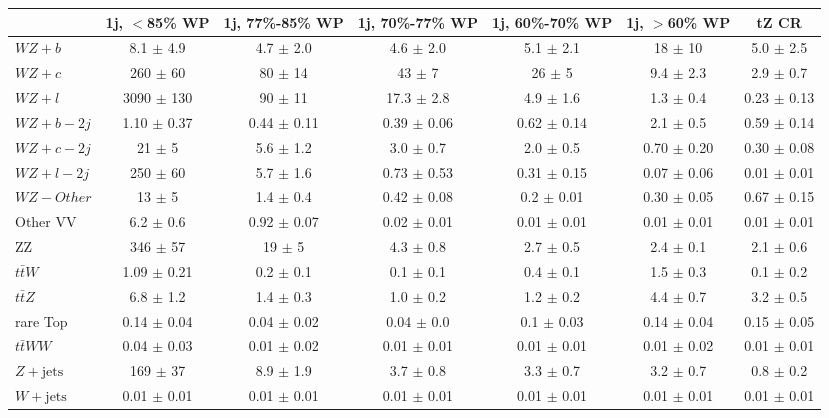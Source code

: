 \begin{tabular}{|l|c|c|c|c|c|c|}
\hline 
 & {1j, $<$85\% WP} & {1j, 77\%-85\% WP} & {1j, 70\%-77\% WP} & {1j, 60\%-70\% WP} & {1j, $>$60\% WP} & {tZ CR}\\
\hline 
  $WZ + b$   & 8.1 $\pm$ 4.9 & 4.7 $\pm$ 2.0 & 4.6 $\pm$ 2.0 & 5.1 $\pm$ 2.1 & 18 $\pm$ 10 & 5.0 $\pm$ 2.5 \\ 
  $WZ + c$   & 260 $\pm$ 60 & 80 $\pm$ 14 & 43 $\pm$ 7 & 26 $\pm$ 5 & 9.4 $\pm$ 2.3 & 2.9 $\pm$ 0.7 \\ 
  $WZ + l$   & 3090 $\pm$ 130 & 90 $\pm$ 11 & 17.3 $\pm$ 2.8 & 4.9 $\pm$ 1.6 & 1.3 $\pm$ 0.4 & 0.23 $\pm$ 0.13 \\ 
  $WZ + b - 2j$   & 1.10 $\pm$ 0.37 & 0.44 $\pm$ 0.11 & 0.39 $\pm$ 0.06 & 0.62 $\pm$ 0.14 & 2.1 $\pm$ 0.5 & 0.59 $\pm$ 0.14 \\
  $WZ + c - 2j$   & 21 $\pm$ 5 & 5.6 $\pm$ 1.2 & 3.0 $\pm$ 0.7 & 2.0 $\pm$ 0.5 & 0.70 $\pm$ 0.20 & 0.30 $\pm$ 0.08\\
  $WZ + l - 2j$   & 250 $\pm$ 60 & 5.7 $\pm$ 1.6 & 0.73 $\pm$ 0.53 & 0.31 $\pm$ 0.15 & 0.07 $\pm$ 0.06 & 0.01 $\pm$ 0.01 \\
  $WZ - Other$   & 13 $\pm$ 5 & 1.4 $\pm$ 0.4 & 0.42 $\pm$ 0.08 & 0.2 $\pm$ 0.01 & 0.30 $\pm$ 0.05 & 0.67 $\pm$ 0.15 \\
  Other VV   & 6.2 $\pm$ 0.6 & 0.92 $\pm$ 0.07 & 0.02 $\pm$ 0.01 & 0.01 $\pm$ 0.01 & 0.01 $\pm$ 0.01 & 0.01 $\pm$ 0.01 \\
  ZZ  & 346 $\pm$ 57 & 19 $\pm$ 5 & 4.3 $\pm$ 0.8 & 2.7 $\pm$ 0.5 & 2.4 $\pm$ 0.1 & 2.1 $\pm$ 0.6 \\ 
  $t\bar{t}W$   & 1.09 $\pm$ 0.21 & 0.2 $\pm$ 0.1 & 0.1 $\pm$ 0.1 & 0.4 $\pm$ 0.1 & 1.5 $\pm$ 0.3 & 0.1 $\pm$ 0.2 \\ 
  $t\bar{t}Z$   & 6.8 $\pm$ 1.2 & 1.4 $\pm$ 0.3 & 1.0 $\pm$ 0.2 & 1.2 $\pm$ 0.2 & 4.4 $\pm$ 0.7 & 3.2 $\pm$ 0.5 \\ 
  rare Top   & 0.14 $\pm$ 0.04 & 0.04 $\pm$ 0.02 & 0.04 $\pm$ 0.0 & 0.1 $\pm$ 0.03 & 0.14 $\pm$ 0.04 & 0.15 $\pm$ 0.05 \\ 
  $t\bar{t}WW$   & 0.04 $\pm$ 0.03 & 0.01 $\pm$ 0.02 & 0.01 $\pm$ 0.01 & 0.01 $\pm$ 0.01 & 0.01 $\pm$ 0.02 & 0.01 $\pm$ 0.01 \\ 
  $Z+\text{jets}$   & 169 $\pm$ 37 & 8.9 $\pm$ 1.9 & 3.7 $\pm$ 0.8 & 3.3 $\pm$ 0.7 & 3.2 $\pm$ 0.7 & 0.8 $\pm$ 0.2 \\ 
  $W+\text{jets}$   & 0.01 $\pm$ 0.01 & 0.01 $\pm$ 0.01 & 0.01 $\pm$ 0.01 & 0.01 $\pm$ 0.01 & 0.01 $\pm$ 0.01 & 0.01 $\pm$ 0.01 \\ 

\end{tabular}

